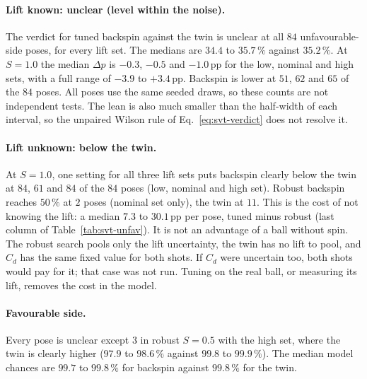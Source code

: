 \paragraph{Lift known: unclear (level within the noise).} The verdict for tuned backspin against the twin is
unclear at all $84$\derived{} unfavourable-side poses, for every lift set. The medians are $34.4$\predicted{} to $35.7\,\%$\predicted{}
against $35.2\,\%$\predicted. At $S=1.0$ the median $\Delta p$ is $-0.3$\predicted, $-0.5$\predicted{} and
$-1.0$\,pp\predicted{} for the low, nominal and high sets, with a full range of $-3.9$\predicted{} to
$+3.4$\,pp\predicted. Backspin is lower at $51$\predicted, $62$\predicted{} and $65$\predicted{} of the $84$
poses. All poses use the same seeded draws, so these counts are not independent tests. The lean is also much
smaller than the half-width of each interval, so the unpaired Wilson rule of Eq.~\eqref{eq:svt-verdict} does
not resolve it.

\paragraph{Lift unknown: below the twin.} At $S=1.0$, one setting for all three lift sets puts backspin clearly
below the twin at $84$\predicted, $61$\predicted{} and $84$\predicted{} of the $84$ poses (low, nominal and high
set). Robust backspin reaches $50\,\%$ at $2$\predicted{} poses (nominal set only), the twin at $11$\predicted.
This is the cost of not knowing the lift: a median $7.3$\predicted{} to $30.1$\,pp\predicted{} per pose, tuned
minus robust (last column of Table~\ref{tab:svt-unfav}). It is not an advantage of a ball without spin. The robust search pools only the
lift uncertainty, the twin has no lift to pool, and $C_d$ has the same fixed value for both shots. If $C_d$ were
uncertain too, both shots would pay for it; that case was not run. Tuning on the real ball, or measuring its
lift, removes the cost in the model.

\paragraph{Favourable side.} Every pose is unclear except $3$\predicted{} in robust $S=0.5$ with the high set,
where the twin is clearly higher ($97.9$\predicted{} to $98.6\,\%$\predicted{} against $99.8$\predicted{} to
$99.9\,\%$\predicted). The median model chances are $99.7$\predicted{} to $99.8\,\%$\predicted{} for backspin
against $99.8\,\%$\predicted{} for the twin.


